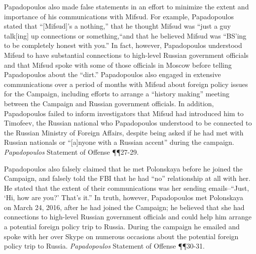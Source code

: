 Papadopoulos also made false statements in an effort to minimize the extent and importance of his communications with Mifsud. 
For example, Papadopoulos stated that ``[Mifsud]'s a nothing,'' that he thought Mifsud was ``just a guy talk[ing] up connections or something,``and that he believed Mifsud was ``BS'ing to be completely honest with you.'' 
In fact, however, Papadopoulos understood Mifsud to have substantial connections to high-level Russian government officials and that Mifsud spoke with some of those officials in Moscow before telling Papadopoulos about the ``dirt.'' 
Papadopoulos also engaged in extensive communications over a period of months with Mifsud about foreign policy issues for the Campaign, including efforts to arrange a ``history making'' meeting between the Campaign and Russian government officials. 
In addition, Papadopoulos failed to inform investigators that Mifsud had introduced him to Timofeev, the Russian national who Papadopoulos understood to be connected to the Russian Ministry of Foreign Affairs, despite being asked if he had met with Russian nationals or ``[a]nyone with a Russian accent'' during the campaign. 
\textit{Papadopoulos} Statement of Offense \P\P 27-29.

Papadopoulos also falsely claimed that he met Polonskaya before he joined the Campaign, and falsely told the FBI that he had ``no'' relationship at all with her. 
He stated that the extent of their communications was her sending emails--``Just, `Hi, how are you?' That's it.'' 
In truth, however, Papadopoulos met Polonskaya on March 24, 2016, after he had joined the Campaign; he believed that she had connections to high-level Russian government officials and could help him arrange a potential foreign policy trip to Russia. 
During the campaign he emailed and spoke with her over Skype on numerous occasions about the potential foreign policy trip to Russia. 
\textit{Papadopoulos} Statement of Offense \P\P 30-31.

